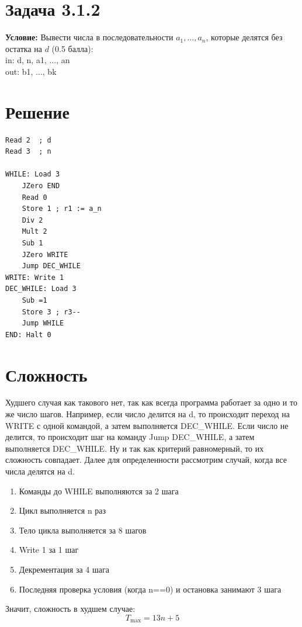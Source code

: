 \documentclass[12pt]{article}
\begin{document}
\section*{Задача 3.1.2}

\textbf{Условие:} Вывести числа в последовательности \(a_1, \dots, a_n\), которые делятся без остатка на \(d\) (0.5 балла):\\
in: d, n, a1, ..., an \\
out: b1, ..., bk

\section*{Решение}

\begin{verbatim}
Read 2  ; d
Read 3  ; n

WHILE: Load 3
    JZero END
    Read 0
    Store 1 ; r1 := a_n
    Div 2
    Mult 2
    Sub 1
    JZero WRITE
    Jump DEC_WHILE
WRITE: Write 1
DEC_WHILE: Load 3
    Sub =1
    Store 3 ; r3--
    Jump WHILE
END: Halt 0
\end{verbatim}

\section*{Сложность}

Худшего случая как такового нет, так как всегда программа работает за одно и то же число шагов. Например, если число делится на d, то происходит переход на WRITE с одной командой, а затем выполняется DEC\_WHILE. Если число не делится, то происходит шаг на команду Jump DEC\_WHILE, а затем выполняется DEC\_WHILE. Ну и так как критерий равномерный, то их сложность совпадает. Далее для определенности рассмотрим случай, когда все числа делятся на d.

\begin{enumerate}
    \item Команды до WHILE выполняются за 2 шага
    \item Цикл выполняется n раз
    \item Тело цикла выполняется за 8 шагов
    \item Write 1 за 1 шаг
    \item Декрементация за 4 шага
    \item Последняя проверка условия (когда n==0) и остановка занимают 3 шага
\end{enumerate}

Значит, сложность в худшем случае:
\[
    T_{\max} = 13n + 5
\]
\end{document}
